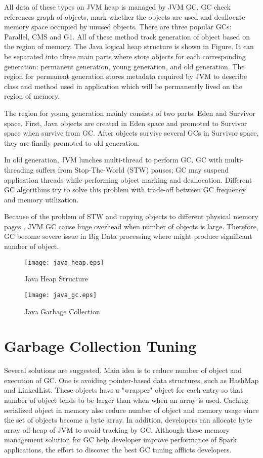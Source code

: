 All data of these types on JVM heap is managed by JVM GC. GC check references graph of objects, mark whether the objects are used and deallocate memory space occupied by unused objects. 
There are three popular GCs: Parallel, CMS and G1. All of these method track generation of object based on the region of memory. 
The Java logical heap structure is shown in Figure. It can be separated into three main parts where store objects for each corresponding generation: 
permanent generation, young generation, and old generation. The region for permanent generation stores metadata required by JVM to describe 
class and method used in application which will be permanently lived on the region of memory. 

The region for young generation mainly consists of two parts: Eden and Survivor space. 
First, Java objects are created in Eden space and promoted to Survivor space when survive from GC. 
After objects survive several GCs in Survivor space, they are finally promoted to old generation.

In old generation, JVM lunches multi-thread to perform GC. GC with multi-threading suffers from Stop-The-World (STW) pauses; 
GC may suspend application threads while performing object marking and deallocation. 
Different GC algorithms try to solve this problem with trade-off between GC frequency and memory utilization. 

Because of the problem of STW and copying objects to different physical memory pages , JVM GC cause huge overhead when number of objects is large. 
Therefore, GC become severe issue in Big Data processing where might produce significant number of object.

\begin{figure}[htb]
    \texttt{[image: java\_heap.eps]}
    \caption{Java Heap Structure}
    \label{fig:Sampling}
\end{figure}

\begin{figure}[htb]
    \texttt{[image: java\_gc.eps]}
    \caption{Java Garbage Collection}
    \label{fig:Sampling}
\end{figure}


\section{Garbage Collection Tuning}
\label{sec:history}
Several solutions are suggested. Main idea is to reduce number of object and execution of GC. 
One is avoiding pointer-based data structures, such as HashMap and LinkedList. These objects have a "wrapper" object for each entry 
so that number of object tends to be larger than when when an array is used. Caching serialized object in memory also reduce number of object and memory usage 
since the set of objects become a byte array. In addition, developers can allocate byte array off-heap of JVM to avoid tracking by GC. 
Although these memory management solution for GC help developer improve performance of Spark applications, the effort to discover the best GC tuning afflicts developers.



